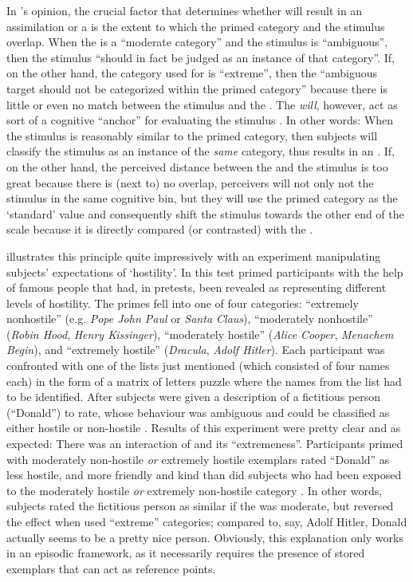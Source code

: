 In \citeauthor{herr1986}'s opinion, the crucial factor that determines whether  will result in an assimilation or a  is the extent to which the primed category and the stimulus overlap.
When the  is a ``moderate category'' and the stimulus is ``ambiguous'', then the stimulus ``should in fact be judged as an instance of that category''.
If, on the other hand, the category used for  is ``extreme'', then the ``ambiguous target should not be categorized within the primed category'' because there is little or even no match between the stimulus and the .
The  \emph{will}, however, act as sort of a cognitive ``anchor'' for evaluating the stimulus \parencite[cf.][1107]{herr1986}.
In other words: When the stimulus is reasonably similar to the primed category, then subjects will classify the stimulus as an instance of the \emph{same} category,  thus results in an .
If, on the other hand, the perceived distance between the  and the stimulus is too great because there is (next to) no overlap, perceivers will not only not  the stimulus in the same cognitive bin, but they will use the primed category as the `standard' value and consequently shift the stimulus towards the other end of the scale because it is directly compared (or contrasted) with the .

\citeauthor{herr1986} illustrates this principle quite impressively with an experiment manipulating subjects' expectations of `hostility'.
In this test \citeauthor{herr1986} primed participants with the help of famous people that had, in pretests, been revealed as representing different levels of hostility.
The primes fell into one of four categories: ``extremely nonhostile'' (e.g. \emph{Pope John Paul} or \emph{Santa Claus}), ``moderately nonhostile'' (\emph{Robin Hood}, \emph{Henry Kissinger}), ``moderately hostile'' (\emph{Alice Cooper}, \emph{Menachem Begin}), and ``extremely hostile'' (\emph{Dracula}, \emph{Adolf Hitler}).
Each participant was confronted with one of the lists just mentioned (which consisted of four names each) in the form of a matrix of letters puzzle where the names from the list had to be identified.
After  subjects were given a description of a fictitious person (``Donald'') to rate, whose behaviour was ambiguous and could be classified as either hostile or non-hostile \parencite[cf.][1108]{herr1986}.
Results of this experiment were pretty clear and as expected: There was an interaction of  and its ``extremeness''.
Participants primed with moderately non-hostile \emph{or} extremely hostile exemplars rated ``Donald'' as less hostile, and more friendly and kind than did subjects who had been exposed to the moderately hostile \emph{or} extremely non-hostile category \parencite[cf.][1109]{herr1986}.
In other words, subjects rated the fictitious person as similar if the  was moderate, but reversed the effect when  used ``extreme'' categories; compared to, say, Adolf Hitler, Donald actually seems to be a pretty nice person.
Obviously, this explanation only works in an episodic framework, as it necessarily requires the presence of stored exemplars that can act as reference points.

